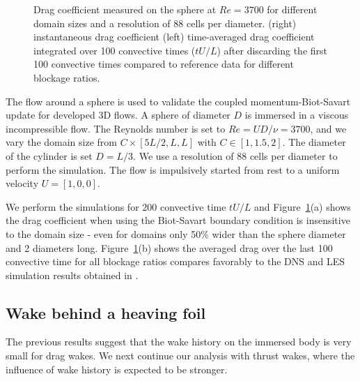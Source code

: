 \documentclass[final,1p,times]{elsarticle}
\begin{document}
\begin{figure}
\begin{subfigure}{.4\textwidth}
    \end{subfigure}
    \caption{Drag coefficient measured on the sphere at $Re = 3700$ for different domain sizes and a resolution of 88 cells per diameter. (right) instantaneous drag coefficient (left) time-averaged drag coefficient integrated over 100 convective times ($tU/L$) after discarding the first 100 convective times compared to reference data for different blockage ratios.}
    \label{fig:sphere}
\end{figure}

The flow around a sphere is used to validate the coupled momentum-Biot-Savart update for developed 3D flows. A sphere of diameter $D$ is immersed in a viscous incompressible flow. The Reynolds number is set to $Re=UD/\nu=3700$, and we vary the domain size from $C\times[5L/2,L,L]$ with $C\in[1,1.5,2]$. The diameter of the cylinder is set $D=L/3$. We use a resolution of 88 cells per diameter to perform the simulation. The flow is impulsively started from rest to a uniform velocity $U=[1,0,0]$. 

We perform the simulations for 200 convective time $tU/L$ and Figure~\ref{fig:sphere}(a) shows the drag coefficient when using the Biot-Savart boundary condition is insensitive to the domain size - even for domains only 50\% wider than the sphere diameter and 2 diameters long. Figure~\ref{fig:sphere}(b) shows the averaged drag over the last 100 convective time for all blockage ratios compares favorably to the DNS and LES simulation results obtained in \cite{Yun2006VorticalNumbers, Rodriguez2011Direct3700}. 

\subsection{Wake behind a heaving foil}

The previous results suggest that the wake history on the immersed body is very small for drag wakes. We next continue our analysis with thrust wakes, where the influence of wake history is expected to be stronger.
\end{document}
